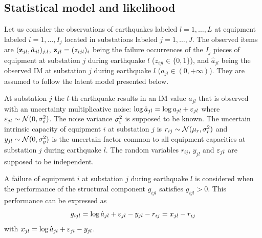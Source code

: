\subsection{Statistical model and likelihood}
\label{subapp:C1}
Let us consider the observations of earthquakes labeled $l=1,\dots,L$ at equipment labeled $i=1,\dots,I_j$ located in substations labeled $j=1,\dots,J$.
The observed items are $(\mathbf{z}_{jl},\hat a_{jl})_{j,l}$, $\mathbf{z}_{jl}=(z_{ijl})_i$ being the failure occurrences of the $I_j$ pieces of equipment at substation $j$ during earthquake $l$ ($z_{ijl}\in\{0,1\}$), and $\hat a_{jl}$ being the observed IM at substation $j$ during earthquake $l$ ($\hat a_{jl}\in(0,+\infty)$).
They are assumed to follow the latent model presented below.

At substation $j$ the $l$-th earthquake results in an IM value $a_{jl}$ that is observed with an uncertainty multiplicative noise: $\log\hat a_{jl}=\log a_{jl}+\varepsilon_{jl}$ where $\varepsilon_{jl}\sim\mathcal{N}(0,\sigma_\varepsilon^2)$. The noise variance $\sigma_\varepsilon^2$ is supposed to be known. %
The uncertain intrinsic capacity of equipment $i$ at substation $j$ is $r_{ij}\sim\mathcal{N}(\mu_r,\sigma^2_r)$ and $y_{jl}\sim\mathcal{N}(0,\sigma^2_y)$ is the uncertain factor common to all equipment capacities at substation $j$ during earthquake $l$.
The random variables $r_{ij}$, $y_{jl}$ and $\varepsilon_{jl}$ are supposed to be independent.

A failure of equipment $i$ at substation $j$ during earthquake $l$ is considered when the performance of the structural component $g_{ijl}$ satisfies $g_{ijl}>0$.%
This performance can be expressed as 
    \begin{equation*}
      g_{ijl} = \log \hat a_{jl}+\varepsilon_{jl}-y_{jl}-r_{ij}=x_{jl}-r_{ij}  
    \end{equation*}
with $x_{jl} = \log \hat a_{jl}+\varepsilon_{jl}-y_{jl}$.

